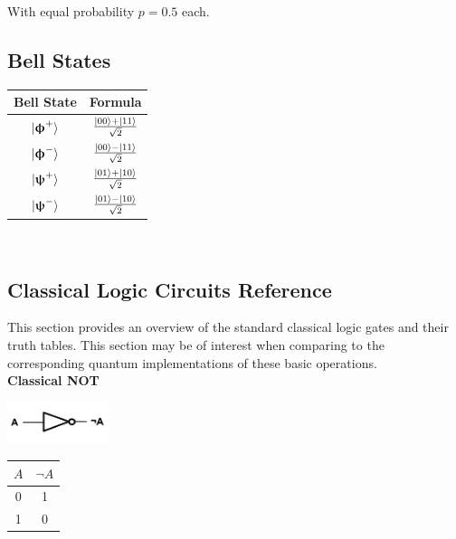 \documentclass[conference]{IEEEtran}
\begin{document}
\begin{appendices}
With equal probability $p=0.5$ each. \\

\subsection{Bell States}
\label{appendix:BellStates}

\begin{center}
\begin{tabular}{cc}
    \toprule
    Bell State & Formula \\
    \midrule
    $\ket{\boldsymbol{\upphi}^+}$ & $\frac{\ket{00} + \ket{11}}{\sqrt{2}}$ \\
    $\ket{\boldsymbol{\upphi}^-}$ & $\frac{\ket{00} - \ket{11}}{\sqrt{2}}$ \\
    $\ket{\boldsymbol{\uppsi}^+}$ & $\frac{\ket{01} + \ket{10}}{\sqrt{2}}$ \\
    $\ket{\boldsymbol{\uppsi}^-}$ & $\frac{\ket{01} - \ket{10}}{\sqrt{2}}$ \\
    \bottomrule
\end{tabular}
\end{center}
 \


\subsection{Classical Logic Circuits Reference}
\label{appendix:ClassicalLogicGates}

This section provides an overview of the standard classical logic gates and their truth tables.
This section may be of interest when comparing to the corresponding quantum implementations of these basic operations. \\

\textbf{Classical NOT}

\centerline{
    \includegraphics[width=0.225\textwidth]{img/classical-not-gate.png}
}
\label{fig:classicalNot}

\begin{center}
\begin{tabular}{|c|c|}
    \hline
    $A$ & $\neg A$ \\
    \hline
    0 & 1 \\
    1 & 0 \\
    \hline
\end{tabular}
\end{center}



\end{appendices}
\end{document}

